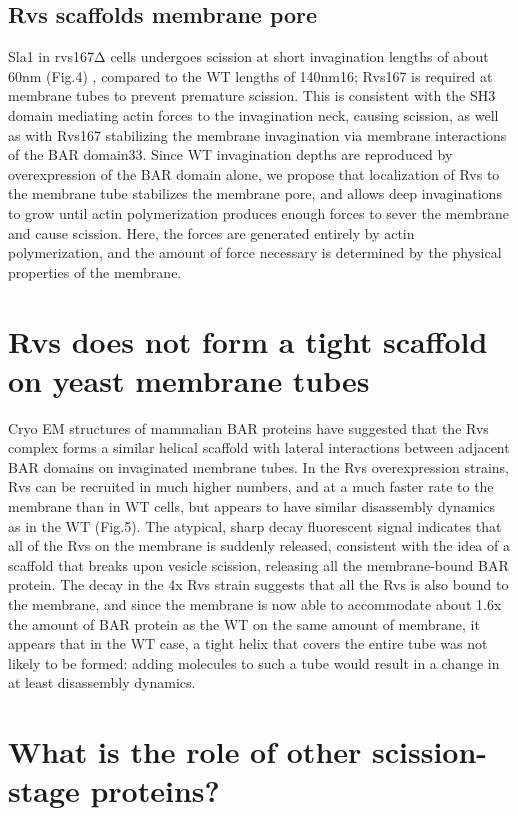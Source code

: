 \subsection{Rvs scaffolds membrane pore}
Sla1 in rvs167Δ cells undergoes scission at short invagination lengths of about 60nm (Fig.4) , compared to the WT lengths of 140nm16; Rvs167 is required at membrane tubes to prevent premature scission. This is consistent with the SH3 domain mediating actin forces to the invagination neck, causing scission, as well as with Rvs167 stabilizing the membrane invagination via membrane interactions of the BAR domain33. Since WT invagination depths are reproduced by overexpression of the BAR domain alone, we propose that localization of Rvs to the membrane tube stabilizes the membrane pore, and allows deep invaginations to grow until actin polymerization produces enough forces to sever the membrane and cause scission. Here, the forces are generated entirely by actin polymerization, and the amount of force necessary is determined by the physical properties of the membrane.

\section{Rvs does not form a tight scaffold on yeast membrane tubes}
Cryo EM structures of mammalian BAR proteins have suggested that the Rvs complex forms a similar helical scaffold with lateral interactions between adjacent BAR domains on invaginated membrane tubes. In the Rvs overexpression strains, Rvs can be recruited in much higher numbers, and at a much faster rate to the membrane than in WT cells, but appears to have similar disassembly dynamics as in the WT (Fig.5). The atypical, sharp decay fluorescent signal indicates that all of the Rvs on the membrane is suddenly released, consistent with the idea of a scaffold that breaks upon vesicle scission, releasing all the membrane-bound BAR protein. The decay in the 4x Rvs strain suggests that all the Rvs is also bound to the membrane, and since the membrane is now able to accommodate about 1.6x the amount of BAR protein as the WT on the same amount of membrane, it appears that in the WT case, a tight helix that covers the entire tube was not likely to be formed: adding molecules to such a tube would result in a change in at least disassembly dynamics.

\section{What is the role of other scission-stage proteins?}
